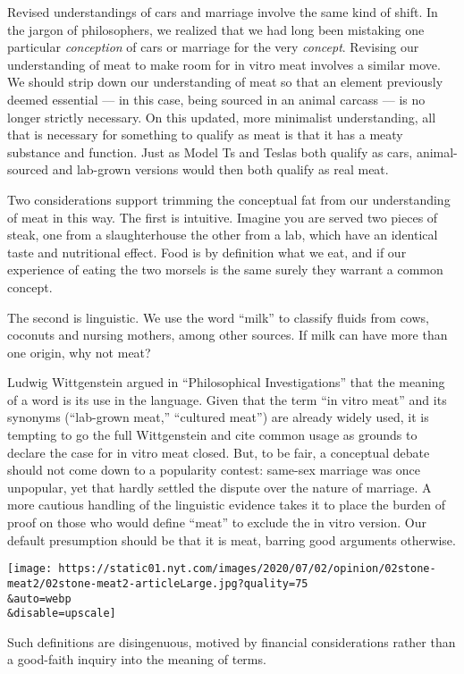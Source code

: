 Revised understandings of cars and marriage involve the same kind of
shift. In the jargon of philosophers, we realized that we had long been
mistaking one particular \emph{conception} of cars or marriage for the
very \emph{concept}. Revising our understanding of meat to make room for
in vitro meat involves a similar move. We should strip down our
understanding of meat so that an element previously deemed essential ---
in this case, being sourced in an animal carcass --- is no longer
strictly necessary. On this updated, more minimalist understanding, all
that is necessary for something to qualify as meat is that it has a
meaty substance and function. Just as Model Ts and Teslas both qualify
as cars, animal-sourced and lab-grown versions would then both qualify
as real meat.

Two considerations support trimming the conceptual fat from our
understanding of meat in this way. The first is intuitive. Imagine you
are served two pieces of steak, one from a slaughterhouse the other from
a lab, which have an identical taste and nutritional effect. Food is by
definition what we eat, and if our experience of eating the two morsels
is the same surely they warrant a common concept.

The second is linguistic. We use the word ``milk'' to classify fluids
from cows, coconuts and nursing mothers, among other sources. If milk
can have more than one origin, why not meat?

Ludwig Wittgenstein argued in ``Philosophical Investigations'' that the
meaning of a word is its use in the language. Given that the term ``in
vitro meat'' and its synonyms (``lab-grown meat,'' ``cultured meat'')
are already widely used, it is tempting to go the full Wittgenstein and
cite common usage as grounds to declare the case for in vitro meat
closed. But, to be fair, a conceptual debate should not come down to a
popularity contest: same-sex marriage was once unpopular, yet that
hardly settled the dispute over the nature of marriage. A more cautious
handling of the linguistic evidence takes it to place the burden of
proof on those who would define ``meat'' to exclude the in vitro
version. Our default presumption should be that it is meat, barring good
arguments otherwise.

\texttt{[image: https://static01.nyt.com/images/2020/07/02/opinion/02stone-meat2/02stone-meat2-articleLarge.jpg?quality=75\\\&auto=webp\\\&disable=upscale]}

Such definitions are disingenuous, motived by financial considerations
rather than a good-faith inquiry into the meaning of terms.

